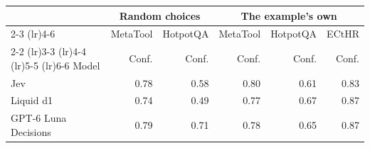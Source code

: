 \begin{tabular}{lrrrrr}
\toprule
 & \multicolumn{2}{c}{Random choices} & \multicolumn{3}{c}{The example's own} \\
\cmidrule(lr){2-3} \cmidrule(lr){4-6}
 & \multicolumn{1}{c}{MetaTool} & \multicolumn{1}{c}{HotpotQA} & \multicolumn{1}{c}{MetaTool} & \multicolumn{1}{c}{HotpotQA} & \multicolumn{1}{c}{ECtHR} \\
\cmidrule(lr){2-2} \cmidrule(lr){3-3} \cmidrule(lr){4-4} \cmidrule(lr){5-5} \cmidrule(lr){6-6}
Model & Conf. & Conf. & Conf. & Conf. & Conf. \\
\midrule
Jev & 0.78 & 0.58 & 0.80 & 0.61 & 0.83 \\
Liquid d1 & 0.74 & 0.49 & 0.77 & 0.67 & 0.87 \\
GPT-6 Luna Decisions & 0.79 & 0.71 & 0.78 & 0.65 & 0.87 \\
\bottomrule
\end{tabular}
